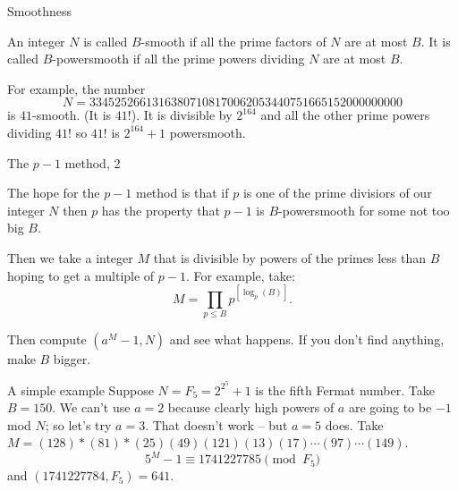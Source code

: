 \documentclass{beamer}
\begin{document}
\begin{frame}{Smoothness}
	\begin{definition}
	An integer $N$ is called $B$-smooth if all the prime factors of $N$ are at most $B$.  It is called $B$-powersmooth if all the prime
	powers dividing $N$ are at most $B$.  
	\end{definition}

	For example, the number
	$$
	N=33452526613163807108170062053440751665152000000000
	$$
	is $41$-smooth. (It is $41!$).  It is divisible by $2^{164}$ and all the other prime powers dividing $41!$ so $41!$ is
	$2^{164}+1$ powersmooth.

	
\end{frame}
\begin{frame}{The $p-1$ method, 2}
	
	The hope for the $p-1$ method is that if $p$ is one  of the prime divisiors of our integer $N$ then $p$ has the property that $p-1$ is $B$-powersmooth
	for some not too big $B$. 

	\bigskip\noindent
	Then we take a integer $M$ that is divisible by powers of the primes less than $B$ hoping to get a multiple of $p-1$. 
	For example, take:
	$$
	M=\prod_{p\le B} p^{[\log_{p}(B)]}.
	$$

	\bigskip\noindent
	Then compute $(a^{M}-1,N)$ and see what happens.  If you don't find anything, make $B$ bigger.

\end{frame}
\begin{frame}{A simple example}
	Suppose $N=F_{5}=2^{2^5}+1$ is the fifth Fermat number.  Take $B=150$.  We can't use $a=2$ because clearly high powers of $a$ are going to be 
	$-1$ mod $N$; so let's try $a=3$. That doesn't work -- but $a=5$ does. Take $M=(128)*(81)*(25)(49)(121)(13)(17)\cdots(97)\cdots(149)$.  
	$$
	5^M-1 \equiv 1741227785\pmod{F_{5}}
	$$
	and $(1741227784,F_{5})=641$. 
\end{frame}
\end{document}
